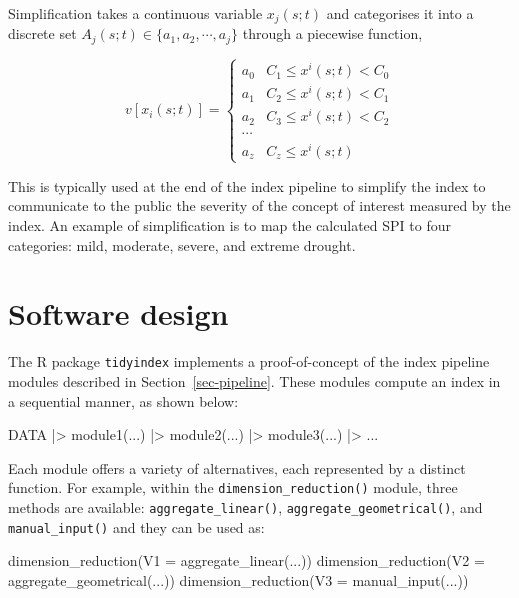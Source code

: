 \documentclass[
]{interact}
\newenvironment{Shaded}{\begin{snugshade}}{\end{snugshade}}
\newcommand{\AttributeTok}[1]{\textcolor[rgb]{0.40,0.45,0.13}{#1}}
\newcommand{\FunctionTok}[1]{\textcolor[rgb]{0.28,0.35,0.67}{#1}}
\newcommand{\NormalTok}[1]{\textcolor[rgb]{0.00,0.23,0.31}{#1}}
\newcommand{\SpecialCharTok}[1]{\textcolor[rgb]{0.37,0.37,0.37}{#1}}
\begin{document}
Simplification takes a continuous variable \(x_j(s;t)\) and categorises
it into a discrete set \(A_j(s;t) \in \{a_1, a_2, \cdots, a_j\}\)
through a piecewise function,

\begin{equation}
v[x_i(s;t)] = 
\begin{cases}
a_0 & C_1 \leq x^i(s; t) < C_0 \\
a_1 & C_2 \leq x^i(s; t) < C_1 \\
a_2 & C_3 \leq x^i(s; t) < C_2 \\
\cdots \\
a_z & C_z \leq x^i(s; t)
\end{cases}
\end{equation}

This is typically used at the end of the index pipeline to simplify the
index to communicate to the public the severity of the concept of
interest measured by the index. An example of simplification is to map
the calculated SPI to four categories: mild, moderate, severe, and
extreme drought.

\hypertarget{sec-software}{%
\section{Software design}\label{sec-software}}

The R package \texttt{tidyindex} implements a proof-of-concept of the
index pipeline modules described in Section~\ref{sec-pipeline}. These
modules compute an index in a sequential manner, as shown below:

\begin{Shaded}
\begin{Highlighting}[]
\NormalTok{DATA }\SpecialCharTok{|\textgreater{}} 
  \FunctionTok{module1}\NormalTok{(...) }\SpecialCharTok{|\textgreater{}}
  \FunctionTok{module2}\NormalTok{(...) }\SpecialCharTok{|\textgreater{}}
  \FunctionTok{module3}\NormalTok{(...) }\SpecialCharTok{|\textgreater{}}
\NormalTok{  ...}
\end{Highlighting}
\end{Shaded}

Each module offers a variety of alternatives, each represented by a
distinct function. For example, within the
\texttt{dimension\_reduction()} module, three methods are available:
\texttt{aggregate\_linear()}, \texttt{aggregate\_geometrical()}, and
\texttt{manual\_input()} and they can be used as:

\begin{Shaded}
\begin{Highlighting}[]
\FunctionTok{dimension\_reduction}\NormalTok{(}\AttributeTok{V1 =} \FunctionTok{aggregate\_linear}\NormalTok{(...))}
\FunctionTok{dimension\_reduction}\NormalTok{(}\AttributeTok{V2 =} \FunctionTok{aggregate\_geometrical}\NormalTok{(...))}
\FunctionTok{dimension\_reduction}\NormalTok{(}\AttributeTok{V3 =} \FunctionTok{manual\_input}\NormalTok{(...))}
\end{Highlighting}
\end{Shaded}
\end{document}
